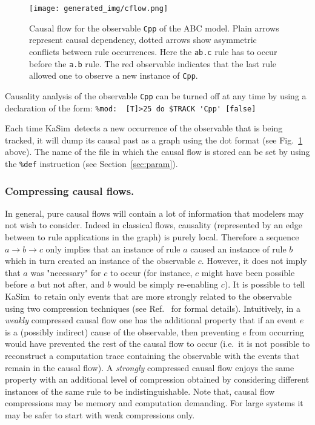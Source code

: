 \documentclass[11pt]{book}
\def\KaSim{\textsf{KaSim}}
\def\ttt#1{\texttt{#1}}
\def\rar{\rightarrow}
\def\ie{i.e.~}
\begin{document}
\begin{figure}[htbp]
\begin{center}
\texttt{[image: generated\_img/cflow.png]}
\caption{Causal flow for the observable \ttt{{\textquotesingle}Cpp{\textquotesingle}} of the ABC model. Plain arrows represent causal dependency, dotted arrows show asymmetric conflicts between rule occurrences. Here the \ttt{{\textquotesingle}ab.c{\textquotesingle}} rule has to occur before the \ttt{{\textquotesingle}a.b{\textquotesingle}} rule. The red observable indicates that the last rule allowed one to observe a new instance of \ttt{{\textquotesingle}Cpp{\textquotesingle}}.}
\label{fig:cflow}
\end{center}
\end{figure}

Causality analysis of the observable \ttt{Cpp} can be turned off at any time by using a declaration of the form:
\lstinline[language=kappa]!%mod:  [T]>25 do $TRACK 'Cpp' [false]!

Each time \KaSim~detects a new occurrence of the observable that is being tracked, it will dump its causal past as a graph using the dot format (see Fig.~\ref{fig:cflow} above). The name of the file in which the causal flow is stored can be set by using the \texttt{\%def} instruction (see Section~\ref{sec:param}).

\subsubsection*{Compressing causal flows.}

In general, pure causal flows will contain a lot of information that modelers may not wish to consider. Indeed in classical flows, causality (represented by an edge between to rule applications in the graph) is purely local. Therefore a sequence $a\rar b \rar c$ only implies that an instance of rule $a$ caused an instance of rule $b$ which in turn created an instance of the observable $c$. However, it does not imply that $a$ was "necessary" for $c$ to occur (for instance, $c$ might have been possible before $a$ but not after, and $b$ would be simply re-enabling $c$). It is possible to tell \KaSim~to retain only events that are more strongly related to the observable using two compression techniques (see Ref.~\cite{Dan_etal12} for formal details). Intuitively, in a \emph{weakly} compressed causal flow one has the additional property that if an event $e$ is a (possibly indirect) cause of the observable, then preventing $e$ from occurring would have prevented the rest of the causal flow to occur ({\ie}it is not possible to reconstruct a computation trace containing the observable with the events that remain in the causal flow). A \emph{strongly} compressed causal flow enjoys the same property with an additional level of compression obtained by considering different instances of the same rule to be indistinguishable. Note that, causal flow compressions may be memory and computation demanding. For large systems it may be safer to start with weak compressions only.
\end{document}
